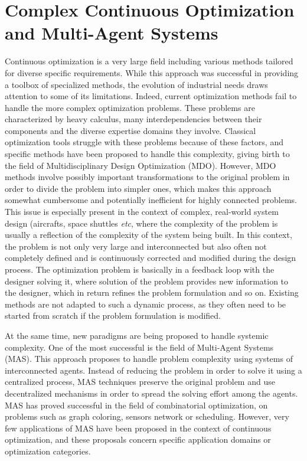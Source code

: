  \label{introduction}

\section*{Complex Continuous Optimization and Multi-Agent Systems}

Continuous optimization is a very large field including various methods tailored for diverse specific requirements. While this approach was successful in providing a toolbox of specialized methods, the evolution of industrial needs draws attention to some of its limitations. Indeed, current optimization methods fail to handle the more complex optimization problems. These problems are characterized by heavy calculus, many interdependencies between their components and the diverse expertise domains they involve. Classical optimization tools struggle with these problems because of these factors, and specific methods have been proposed to handle this complexity, giving birth to the field of Multidisciplinary Design Optimization (MDO). However, MDO methods involve possibly important transformations to the original problem in order to divide the problem into simpler ones, which makes this approach somewhat cumbersome and potentially inefficient for highly connected problems.\\
This issue is especially present in the context of complex, real-world system design (aircrafts, space shuttles \emph{etc}, where the complexity of the problem is usually a reflection of the complexity of the system being built. In this context, the problem is not only very large and interconnected but also often not completely defined and is continuously corrected and modified during the design process. The optimization problem is basically in a feedback loop with the designer solving it, where solution of the problem provides new information to the designer, which in return refines the problem formulation and so on. Existing methods are not adapted to such a dynamic process, as they often need to be started from scratch if the problem formulation is modified.

At the same time, new paradigms are being proposed to handle systemic complexity. One of the most successful is the field of Multi-Agent Systems (MAS). This approach proposes to handle problem complexity using systems of interconnected agents. Instead of reducing the problem in order to solve it using a centralized process, MAS techniques preserve the original problem and use decentralized mechanisms in order to spread the solving effort among the agents. MAS has proved successful in the field of combinatorial optimization, on problems such as graph coloring, sensors network or scheduling. However, very few applications of MAS have been proposed in the context of continuous optimization, and these proposals concern specific application domains or optimization categories.

